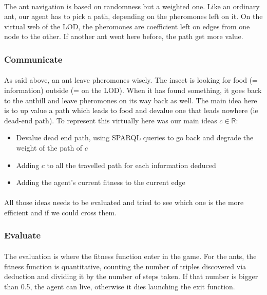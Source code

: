 \documentclass{article}
\newenvironment{itemh}[0]{\begin{itemize}[label=$\heartsuit$, font=\color{mygray} \small]}{\end{itemize}}
\begin{document}
	\paragraph{}
	The ant navigation is based on randomness but a weighted one.
	Like an ordinary ant, our agent has to pick a path, depending on the pheromones left on it.
	On the virtual web of the LOD, the pheromones are coefficient left on edges from one node to the other.
	If another ant went here before, the path get more value.
	\subsubsection{Communicate}
	\paragraph{}
	As said above, an ant leave pheromones wisely.
	The insect is looking for food (= information) outside (= on the LOD).
	When it has found something, it goes back to the anthill and leave pheromones on its way back as well.
	The main idea here is to up value a path which leads to food and devalue one that leads nowhere (ie dead-end path).
	To represent this virtually here was our main ideas $c \in \mathbb{R}$:
	\begin{itemh}
	\item Devalue dead end path, using SPARQL queries to go back and degrade the weight of the path of $c$
	\item Adding $c$ to all the travelled path for each information deduced
	\item Adding the agent's current fitness to the current edge
	\end{itemh}
	\paragraph{}
	All those ideas needs to be evaluated and tried to see which one is the more efficient and if we could cross them.
	\subsubsection{Evaluate}
	\paragraph{}
	The evaluation is where the fitness function enter in the game.
	For the ants, the fitness function is quantitative,
	counting the number of triples discovered via deduction and dividing it by the number of steps taken.
	If that number is bigger than 0.5, the agent can live, otherwise it dies launching the exit function.
\end{document}
